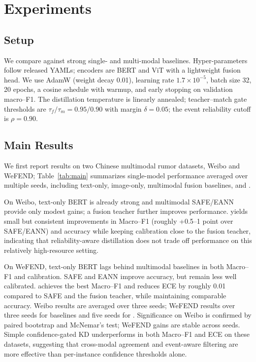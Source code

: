 \section{Experiments}
\label{sec:experiments}
\subsection{Setup}
We compare \modelname{} against strong single- and multi-modal baselines. Hyper-parameters follow released YAMLs; encoders are BERT and ViT with a lightweight fusion head. We use AdamW (weight decay 0.01), learning rate $1.7\times10^{-5}$, batch size 32, 20 epochs, a cosine schedule with warmup, and early stopping on validation macro--F1. The distillation temperature is linearly annealed; teacher--match gate thresholds are $\tau_f/\tau_m=0.95/0.90$ with margin $\delta=0.05$; the event reliability cutoff is $\rho=0.90$.

\subsection{Main Results}
We first report results on two Chinese multimodal rumor datasets, Weibo and WeFEND; Table~\ref{tab:main} summarizes single-model performance averaged over multiple seeds, including text-only, image-only, multimodal fusion baselines, and \modelname{}.

On Weibo, text-only BERT is already strong and multimodal SAFE/EANN provide only modest gains; a fusion teacher further improves performance. \modelname{} yields small but consistent improvements in Macro--F1 (roughly +0.5--1 point over SAFE/EANN) and accuracy while keeping calibration close to the fusion teacher, indicating that reliability-aware distillation does not trade off performance on this relatively high-resource setting.

On WeFEND, text-only BERT lags behind multimodal baselines in both Macro--F1 and calibration. SAFE and EANN improve accuracy, but remain less well calibrated. \modelname{} achieves the best Macro--F1 and reduces ECE by roughly 0.01 compared to SAFE and the fusion teacher, while maintaining comparable accuracy. Weibo results are averaged over three seeds; WeFEND results over three seeds for baselines and five seeds for \modelname{}. Significance on Weibo is confirmed by paired bootstrap and McNemar's test; WeFEND gains are stable across seeds. Simple confidence-gated KD underperforms \modelname{} in both Macro--F1 and ECE on these datasets, suggesting that cross-modal agreement and event-aware filtering are more effective than per-instance confidence thresholds alone.

